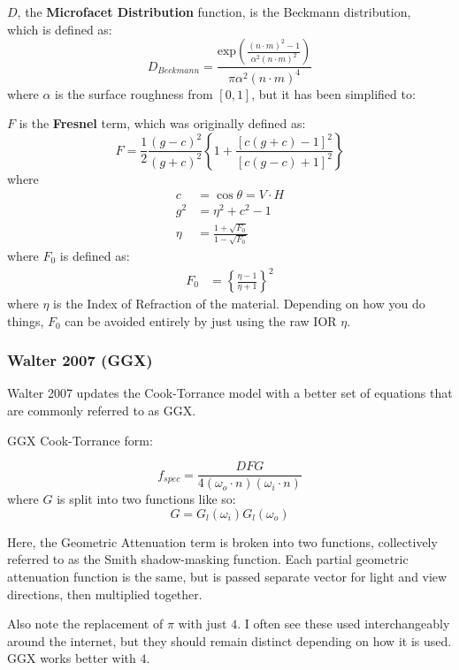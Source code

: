 \documentclass[12pt,letterpaper]{article}
\begin{document}
$D$, the \textbf{Microfacet Distribution} function, is the Beckmann distribution,\\
which is defined as:
$$
D_{Beckmann} = \frac{
    \text{exp}\left(
                    \frac{{\left( n \cdot m \right)}^2 - 1}
                         {\alpha^2 {\left( n \cdot m \right)}^2} \right)}
    {\pi \alpha^2 {\left( n \cdot m \right)}^4}
$$
where $\alpha$ is the surface roughness from $\left[0,1\right]$, but it has been simplified to:

$F$ is the \textbf{Fresnel} term, which was originally defined as:
$$
F = \frac{1}{2}\frac{{\left( g - c \right)}^2}{{\left( g + c \right)}^2} 
    \left\lbrace
        1 + \frac{
            {\left[c\left( g + c \right) - 1\right]}^2
                }{
            {\left[c\left( g - c \right) + 1\right]}^2
                }
    \right\rbrace
$$
where
\begin{align*}
c &= \cos \theta = V \cdot H\\
g^2 &= \eta^2 + c^2 - 1\\
\eta &= \frac{1 + \sqrt{F_0}}{1 - \sqrt{F_0}}
\end{align*}
where $F_0$ is defined as:
\begin{align*}
F_0 &= {\left\lbrace \frac{\eta - 1}{\eta + 1} \right\rbrace}^2
\end{align*}
where $\eta$ is the Index of Refraction of the material. Depending on how you do things, $F_0$ can be avoided entirely by just using the raw IOR $\eta$.

\newpage

\subsubsection{Walter 2007 (GGX)}

Walter 2007 updates the Cook-Torrance model with a better set of equations that are commonly referred to as GGX.

GGX Cook-Torrance form:

$$
f_{spec} = \frac{D F G}{4 \left( \omega_o \cdot n \right) \left( \omega_i \cdot n \right) }
$$
where $G$ is split into two functions like so:
$$G = G_l(\omega_i) G_l(\omega_o)$$

Here, the Geometric Attenuation term is broken into two functions, collectively referred to as the Smith shadow-masking function. Each partial geometric attenuation function is the same, but is passed separate vector for light and view directions, then multiplied together.

Also note the replacement of $\pi$ with just $4$. I often see these used interchangeably around the internet, but they should remain distinct depending on how it is used. GGX works better with $4$.
\end{document}
